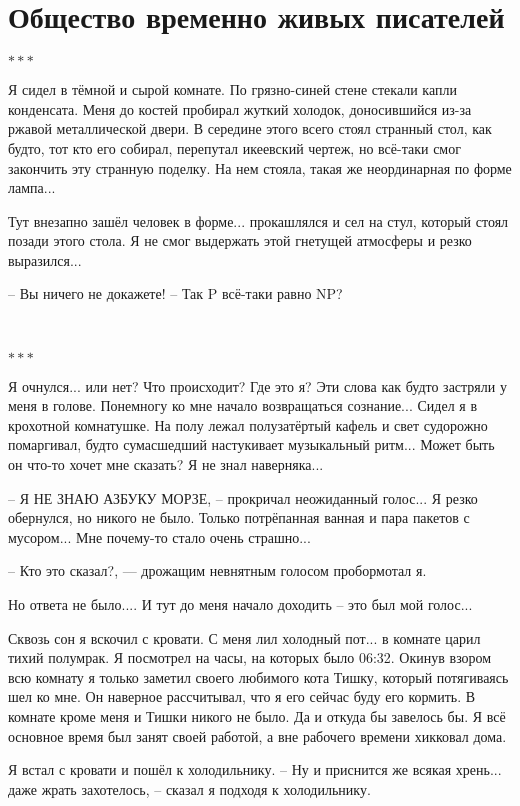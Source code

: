 \section{Общество временно живых писателей}

\begin{center}\( *** \)\end{center}
Я сидел в тёмной и сырой комнате. По грязно-синей стене стекали капли конденсата. Меня до костей пробирал жуткий холодок, доносившийся из-за ржавой металлической двери. В середине этого всего стоял странный стол, как будто, тот кто его собирал, перепутал икеевский чертеж, но всё-таки смог закончить эту странную поделку. На нем стояла, такая же неординарная по форме лампа...

Тут внезапно зашёл человек в форме... прокашлялся и сел на стул, который стоял позади этого стола. Я не смог выдержать этой гнетущей атмосферы и резко выразился...

-- Вы ничего не докажете!
-- Так P всё-таки равно NP?

\
\begin{center}\( *** \)\end{center}
Я очнулся... или нет? Что происходит? Где это я? Эти слова как будто застряли у меня в голове. Понемногу ко мне начало возвращаться сознание... Сидел я в крохотной комнатушке. На полу лежал полузатёртый кафель и свет судорожно помаргивал, будто сумасшедший настукивает музыкальный ритм... Может быть он что-то хочет мне сказать? Я не знал наверняка...

-- Я НЕ ЗНАЮ АЗБУКУ МОРЗЕ, -- прокричал неожиданный голос...
Я резко обернулся, но никого не было. Только потрёпанная ванная и пара пакетов с мусором... Мне почему-то стало очень страшно...

-- Кто это сказал?, — дрожащим невнятным голосом пробормотал я.

Но ответа не было.... И тут до меня начало доходить -- это был мой голос...

Сквозь сон я вскочил с кровати. С меня лил холодный пот... в комнате царил тихий полумрак. Я посмотрел на часы, на которых было 06:32. Окинув взором всю комнату я только заметил своего любимого кота Тишку, который потягиваясь шел ко мне. Он наверное рассчитывал, что я его сейчас буду его кормить. В комнате кроме меня и Тишки никого не было. Да и откуда бы завелось бы. Я всё основное время был занят своей работой, а вне рабочего времени хикковал дома.

Я встал с кровати и пошёл к холодильнику.
-- Ну и приснится же всякая хрень... даже жрать захотелось, -- сказал я подходя к холодильнику.

